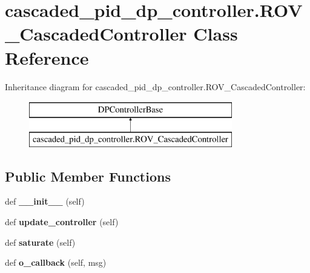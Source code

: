 \hypertarget{classcascaded__pid__dp__controller_1_1ROV__CascadedController}{}\section{cascaded\+\_\+pid\+\_\+dp\+\_\+controller.\+R\+O\+V\+\_\+\+Cascaded\+Controller Class Reference}
\label{classcascaded__pid__dp__controller_1_1ROV__CascadedController}
Inheritance diagram for cascaded\+\_\+pid\+\_\+dp\+\_\+controller.\+R\+O\+V\+\_\+\+Cascaded\+Controller\+:\begin{figure}[H]
\begin{center}
\leavevmode
\includegraphics[height=2.000000cm]{classcascaded__pid__dp__controller_1_1ROV__CascadedController}
\end{center}
\end{figure}
\subsection*{Public Member Functions}
\begin{DoxyCompactItemize}
\item 
\mbox{\label{classcascaded__pid__dp__controller_1_1ROV__CascadedController_a277d2e07b81594de07aa3477e6ae261d}} 
def {\bfseries \+\_\+\+\_\+init\+\_\+\+\_\+} (self)
\item 
\mbox{\label{classcascaded__pid__dp__controller_1_1ROV__CascadedController_a1cc82f283935755f8266a99306db7630}} 
def {\bfseries update\+\_\+controller} (self)
\item 
\mbox{\label{classcascaded__pid__dp__controller_1_1ROV__CascadedController_ac1af04339761dccbdf63e221f7810a4e}} 
def {\bfseries saturate} (self)
\item 
\mbox{\label{classcascaded__pid__dp__controller_1_1ROV__CascadedController_a5daec29e7c845db15a95be7b242cdbd1}} 
def {\bfseries o\+\_\+callback} (self, msg)
\end{DoxyCompactItemize}
